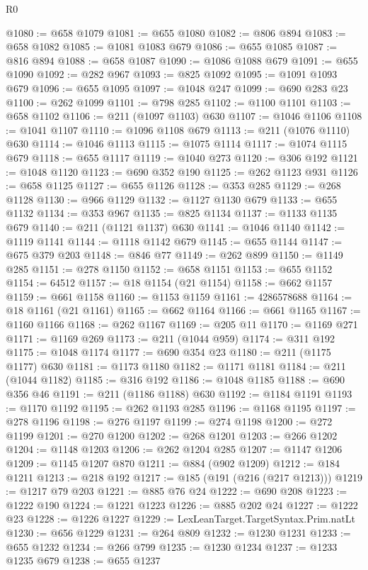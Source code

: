 \begin{lexlean}{R0}
\begin{coremodule}
@1080 := @658 @1079
@1081 := @655 @1080
@1082 := @806 @894
@1083 := @658 @1082
@1085 := @1081 @1083 @679
@1086 := @655 @1085
@1087 := @816 @894
@1088 := @658 @1087
@1090 := @1086 @1088 @679
@1091 := @655 @1090
@1092 := @282 @967
@1093 := @825 @1092
@1095 := @1091 @1093 @679
@1096 := @655 @1095
@1097 := @1048 @247
@1099 := @690 @283 @23
@1100 := @262 @1099
@1101 := @798 @285
@1102 := @1100 @1101
@1103 := @658 @1102
@1106 := @211 (@1097 @1103) @630
@1107 := @1046 @1106
@1108 := @1041 @1107
@1110 := @1096 @1108 @679
@1113 := @211 (@1076 @1110) @630
@1114 := @1046 @1113
@1115 := @1075 @1114
@1117 := @1074 @1115 @679
@1118 := @655 @1117
@1119 := @1040 @273
@1120 := @306 @192
@1121 := @1048 @1120
@1123 := @690 @352 @190
@1125 := @262 @1123 @931
@1126 := @658 @1125
@1127 := @655 @1126
@1128 := @353 @285
@1129 := @268 @1128
@1130 := @966 @1129
@1132 := @1127 @1130 @679
@1133 := @655 @1132
@1134 := @353 @967
@1135 := @825 @1134
@1137 := @1133 @1135 @679
@1140 := @211 (@1121 @1137) @630
@1141 := @1046 @1140
@1142 := @1119 @1141
@1144 := @1118 @1142 @679
@1145 := @655 @1144
@1147 := @675 @379 @203
@1148 := @846 @77
@1149 := @262 @899
@1150 := @1149 @285
@1151 := @278 @1150
@1152 := @658 @1151
@1153 := @655 @1152
@1154 := 64512
@1157 := @18 @1154 (@21 @1154)
@1158 := @662 @1157
@1159 := @661 @1158
@1160 := @1153 @1159
@1161 := 4286578688
@1164 := @18 @1161 (@21 @1161)
@1165 := @662 @1164
@1166 := @661 @1165
@1167 := @1160 @1166
@1168 := @262 @1167
@1169 := @205 @11
@1170 := @1169 @271
@1171 := @1169 @269
@1173 := @211 (@1044 @959)
@1174 := @311 @192
@1175 := @1048 @1174
@1177 := @690 @354 @23
@1180 := @211 (@1175 @1177) @630
@1181 := @1173 @1180
@1182 := @1171 @1181
@1184 := @211 (@1044 @1182)
@1185 := @316 @192
@1186 := @1048 @1185
@1188 := @690 @356 @46
@1191 := @211 (@1186 @1188) @630
@1192 := @1184 @1191
@1193 := @1170 @1192
@1195 := @262 @1193 @285
@1196 := @1168 @1195
@1197 := @278 @1196
@1198 := @276 @1197
@1199 := @274 @1198
@1200 := @272 @1199
@1201 := @270 @1200
@1202 := @268 @1201
@1203 := @266 @1202
@1204 := @1148 @1203
@1206 := @262 @1204 @285
@1207 := @1147 @1206
@1209 := @1145 @1207 @870
@1211 := @884 (@902 @1209)
@1212 := @184 @1211
@1213 := @218 @192
@1217 := @185 (@191 (@216 (@217 @1213)))
@1219 := @1217 @79 @203
@1221 := @885 @76 @24
@1222 := @690 @208
@1223 := @1222 @190
@1224 := @1221 @1223
@1226 := @885 @202 @24
@1227 := @1222 @23
@1228 := @1226 @1227
@1229 := LexLeanTarget.TargetSyntax.Prim.natLt
@1230 := @656 @1229
@1231 := @264 @809
@1232 := @1230 @1231
@1233 := @655 @1232
@1234 := @266 @799
@1235 := @1230 @1234
@1237 := @1233 @1235 @679
@1238 := @655 @1237

\end{coremodule}
\end{lexlean}
